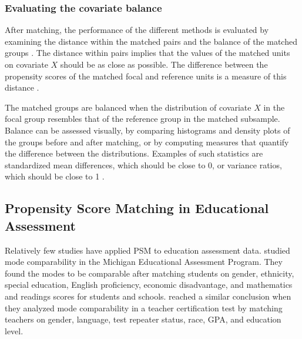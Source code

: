 \documentclass{article}
\begin{document}
\subsubsection{Evaluating the covariate balance} \label{sec:balance}

After matching, the performance of the different methods is evaluated by examining the distance within the matched pairs and the balance of the matched groups \citep{gu1993comparison}. The distance within pairs implies that the values of the matched units on covariate $X$ should be as close as possible. The difference between the propensity scores of the matched focal and reference units is a measure of this distance \citep{stuart2010matching}. 

The matched groups are balanced when the distribution of covariate $X$ in the focal group resembles that of the reference group in the matched subsample. Balance can be assessed visually, by comparing histograms and density plots of the groups before and after matching, or by computing measures that quantify the difference between the distributions. Examples of such statistics are standardized mean differences, which should be close to 0, or variance ratios, which should be close to 1 \citep{chen2020propensity}. 

\subsection{Propensity Score Matching in Educational Assessment}

Relatively few studies have applied PSM to education assessment data. \citet{seo2015comparability} studied mode comparability in the Michigan Educational Assessment Program. They found the modes to be comparable after matching students on gender, ethnicity, special education, English proficiency, economic disadvantage, and mathematics and readings scores for students and schools. \citet{puhan2005evaluating} reached a similar conclusion when they analyzed mode comparability in a teacher certification test by matching teachers on gender, language, test repeater status, race, GPA, and education level.
\end{document}
